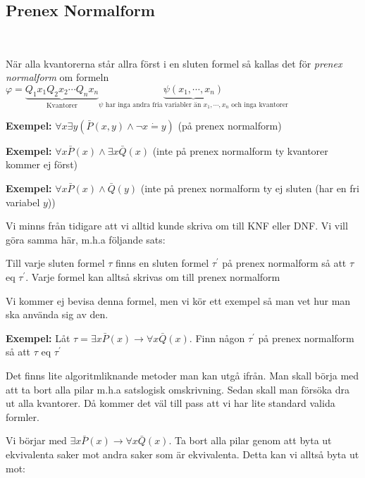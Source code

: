 \subsection{Prenex Normalform}\hfill\\
\par\bigskip
\noindent När alla kvantorerna står allra först i en sluten formel så kallas det för \textit{prenex normalform} om formeln $\varphi = \underbrace{Q_1x_1Q_2x_2\cdots Q_nx_n}_{\text{Kvantorer}}\underbrace{\psi(x_1,\cdots,x_n)}_{\text{$\psi$ har inga andra fria variabler än $x_1,\cdots,x_n$ och inga kvantorer}}$
\par\bigskip
\noindent 
\par\bigskip
\noindent \textbf{Exempel:} $\forall x\exists y(\bar{P}(x,y)\wedge\neg x\dot{=}y)$ (på prenex normalform)
\par\bigskip
\noindent\textbf{Exempel: }$\forall x\bar{P}(x)\wedge\exists x\bar{Q}(x)$ (inte  på prenex normalform ty kvantorer kommer ej först)
\par\bigskip
\noindent\textbf{Exempel: }$\forall x \bar{P}(x)\wedge\bar{Q}(y)$ (inte på prenex normalform ty ej sluten (har en fri variabel $y$))
\par\bigskip
\noindent Vi minns från tidigare att vi alltid kunde skriva om till KNF eller DNF. Vi vill göra samma här, m.h.a följande sats:
\par\bigskip
\begin{theo}
  Till varje sluten formel $\tau$ finns en sluten formel $\tau^{\prime}$ på prenex normalform så att $\tau$ eq $\tau^{\prime}$. Varje formel kan alltså skrivas om till prenex normalform
\end{theo}
\par\bigskip
\noindent Vi kommer ej bevisa denna formel, men vi kör ett exempel så man vet hur man ska använda sig av den.
\par\bigskip
\noindent\textbf{Exempel: } Låt $\tau = \exists x \bar{P}(x)\rightarrow \forall x\bar{Q}(x)$. Finn någon $\tau^{\prime}$ på prenex normalform så att $\tau$ eq $\tau^{\prime}$
\par\bigskip
\noindent Det finns lite algoritmliknande metoder man kan utgå ifrån. Man skall börja med att ta bort alla pilar m.h.a satslogisk omskrivning. Sedan skall man försöka dra ut alla kvantorer. Då kommer det väl till pass att vi har lite standard valida formler.
\par\bigskip
\noindent Vi börjar med $\exists x\bar{P}(x)\rightarrow\forall x\bar{Q}(x)$. Ta bort alla pilar genom att byta ut ekvivalenta saker mot andra saker som är ekvivalenta. Detta kan vi alltså byta ut mot:
